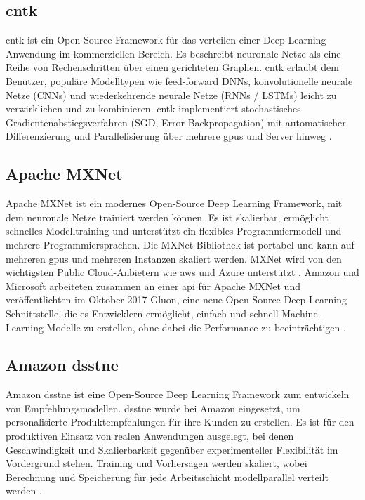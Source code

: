 \subsection{\acf{cntk}}
\ac{cntk} ist ein Open-Source Framework für das verteilen einer Deep-Learning Anwendung im kommerziellen Bereich. Es beschreibt neuronale Netze als eine Reihe von Rechenschritten über einen gerichteten Graphen. \ac{cntk} erlaubt dem Benutzer, populäre Modelltypen wie feed-forward DNNs, konvolutionelle neurale Netze (CNNs) und wiederkehrende neurale Netze (RNNs / LSTMs) leicht zu verwirklichen und zu kombinieren. \ac{cntk} implementiert stochastisches Gradientenabstiegsverfahren (SGD, Error Backpropagation) mit automatischer Differenzierung und Parallelisierung über mehrere \ac{gpu}s und Server hinweg \cite{CNTK}.

\subsection{Apache MXNet}
Apache MXNet ist ein modernes Open-Source Deep Learning Framework, mit dem neuronale Netze trainiert werden können. Es ist skalierbar, ermöglicht schnelles Modelltraining und unterstützt ein flexibles Programmiermodell und mehrere Programmiersprachen. Die MXNet-Bibliothek ist portabel und kann auf mehreren \ac{gpu}s und mehreren Instanzen skaliert werden. MXNet wird von den wichtigsten Public Cloud-Anbietern wie \ac{aws} und Azure unterstützt \cite{WikipediaApacheMXNet}. Amazon und Microsoft arbeiteten zusammen an einer \ac{api} für Apache MXNet und veröffentlichten im Oktober 2017 Gluon, eine neue Open-Source Deep-Learning Schnittstelle, die es Entwicklern ermöglicht, einfach und schnell Machine-Learning-Modelle zu erstellen, ohne dabei die Performance zu beeinträchtigen \cite{AWSintroducingGluon}.

\subsection{Amazon \acs{dsstne}}
Amazon \ac{dsstne} ist eine Open-Source Deep Learning Framework zum entwickeln von Empfehlungsmodellen. \ac{dsstne} wurde bei Amazon eingesetzt, um personalisierte Produktempfehlungen für ihre Kunden zu erstellen. Es ist für den produktiven Einsatz von realen Anwendungen ausgelegt, bei denen Geschwindigkeit und Skalierbarkeit gegenüber experimenteller Flexibilität im Vordergrund stehen. Training und Vorhersagen werden skaliert, wobei Berechnung und Speicherung für jede Arbeitsschicht modellparallel verteilt werden \cite{Amazon DSSTNE}.

